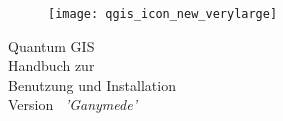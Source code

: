 \begin{titlepage}
\begin{center}

\begin{figure}[H]
\begin{center}
\texttt{[image: qgis\_icon\_new\_verylarge]} 
\end{center}
\end{figure}

\Huge{Quantum GIS}\\
\vspace{0.5cm}
\Large{Handbuch zur \\Benutzung und Installation} \\
\vspace{0.5cm}
\large{Version ~\CURRENT \textsl{'Ganymede'}}


\end{center}
\end{titlepage}
